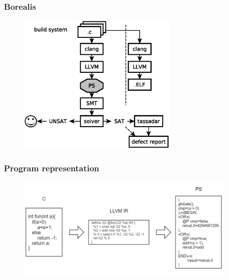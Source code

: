 
\begin{frame}
	\frametitle{Borealis}
	
	\begin{figure}
	\includegraphics[width=80mm]{image/BorealisOverview}
	\end{figure}	
	
\end{frame}


\begin{frame}
	\frametitle{Program representation}
	\begin{figure}
	\includegraphics[width=110mm, keepaspectratio]{image/PSdef}
	\end{figure}
\end{frame}


